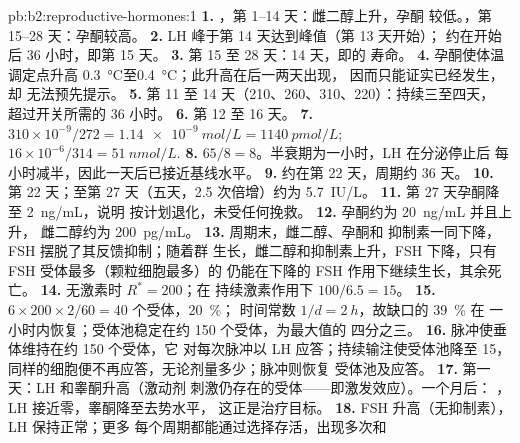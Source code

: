 \begin{solution}{pb:b2:reproductive-hormones:1}
\textbf{1.} ，第 1--14 天：雌二醇上升，孕酮
较低。，第 15--28 天：孕酮较高。
\textbf{2.} LH 峰于第 14 天达到峰值（第 13 天开始）；
约在开始后 36 小时，即第 15 天。
\textbf{3.} 第 15 至 28 天：14 天，即的
寿命。
\textbf{4.} 孕酮使体温调定点升高
\qty{0.3}{\celsius}至\qty{0.4}{\celsius}；此升高在后一两天出现，
因而只能证实已经发生，却
无法预先提示。
\textbf{5.} 第 11 至 14 天（210、260、310、220）：持续三至四天，
超过开关所需的 36 小时。
\textbf{6.} 第 12 至 16 天。
\textbf{7.} $310\times 10^{-9}/272 = \qty{1.14e-9}{mol/L} =
\qty{1140}{pmol/L}$; $16\times 10^{-6}/314 = \qty{51}{nmol/L}$.
\textbf{8.} $65/8 = 8$。半衰期为一小时，LH 在分泌停止后
每小时减半，因此一天后已接近基线水平。
\textbf{9.} 约在第 22 天，周期约 36 天。
\textbf{10.} 第 22 天；至第 27 天（五天，2.5
次倍增）约为 \qty{5.7}{IU/L}。
\textbf{11.} 第 27 天孕酮降至 \qty{2}{ng/mL}，说明
按计划退化，未受任何挽救。
\textbf{12.} 孕酮约为 \qty{20}{ng/mL} 并且上升，
雌二醇约为 \qty{200}{pg/mL}。
\textbf{13.} 周期末，雌二醇、孕酮和
抑制素一同下降，FSH 摆脱了其反馈抑制；随着群
生长，雌二醇和抑制素上升，FSH 下降，只有
FSH 受体最多（颗粒细胞最多）的
仍能在下降的 FSH 作用下继续生长，其余死亡。
\textbf{14.} 无激素时 $R^* = 200$；在
持续激素作用下 $100/6.5 = 15$。
\textbf{15.} $6\times 200\times 2/60 = 40$ 个受体，\qty{20}{\%}；
时间常数 $1/d = \qty{2}{h}$，故缺口的 \qty{39}{\%} 在
一小时内恢复；受体池稳定在约 150 个受体，为最大值的
四分之三。
\textbf{16.} 脉冲使垂体维持在约 150 个受体，它
对每次脉冲以 LH 应答；持续输注使受体池降至
15，同样的细胞便不再应答，无论剂量多少；脉冲则恢复
受体池及应答。
\textbf{17.} 第一天：LH 和睾酮升高（激动剂
刺激仍存在的受体——即激发效应）。一个月后：
，LH 接近零，睾酮降至去势水平，
这正是治疗目标。
\textbf{18.} FSH 升高（无抑制素），LH 保持正常；更多
每个周期都能通过选择存活，出现多次和

\end{solution}
